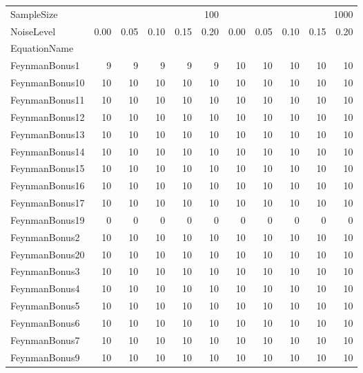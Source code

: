 \begin{tabular}{lrrrrrrrrrr}
\toprule
SampleSize & \multicolumn{5}{r}{100} & \multicolumn{5}{r}{1000} \\
NoiseLevel & 0.00 & 0.05 & 0.10 & 0.15 & 0.20 & 0.00 & 0.05 & 0.10 & 0.15 & 0.20 \\
EquationName &  &  &  &  &  &  &  &  &  &  \\
\midrule
FeynmanBonus1 & 9 & 9 & 9 & 9 & 9 & 10 & 10 & 10 & 10 & 10 \\
FeynmanBonus10 & 10 & 10 & 10 & 10 & 10 & 10 & 10 & 10 & 10 & 10 \\
FeynmanBonus11 & 10 & 10 & 10 & 10 & 10 & 10 & 10 & 10 & 10 & 10 \\
FeynmanBonus12 & 10 & 10 & 10 & 10 & 10 & 10 & 10 & 10 & 10 & 10 \\
FeynmanBonus13 & 10 & 10 & 10 & 10 & 10 & 10 & 10 & 10 & 10 & 10 \\
FeynmanBonus14 & 10 & 10 & 10 & 10 & 10 & 10 & 10 & 10 & 10 & 10 \\
FeynmanBonus15 & 10 & 10 & 10 & 10 & 10 & 10 & 10 & 10 & 10 & 10 \\
FeynmanBonus16 & 10 & 10 & 10 & 10 & 10 & 10 & 10 & 10 & 10 & 10 \\
FeynmanBonus17 & 10 & 10 & 10 & 10 & 10 & 10 & 10 & 10 & 10 & 10 \\
FeynmanBonus19 & 0 & 0 & 0 & 0 & 0 & 0 & 0 & 0 & 0 & 0 \\
FeynmanBonus2 & 10 & 10 & 10 & 10 & 10 & 10 & 10 & 10 & 10 & 10 \\
FeynmanBonus20 & 10 & 10 & 10 & 10 & 10 & 10 & 10 & 10 & 10 & 10 \\
FeynmanBonus3 & 10 & 10 & 10 & 10 & 10 & 10 & 10 & 10 & 10 & 10 \\
FeynmanBonus4 & 10 & 10 & 10 & 10 & 10 & 10 & 10 & 10 & 10 & 10 \\
FeynmanBonus5 & 10 & 10 & 10 & 10 & 10 & 10 & 10 & 10 & 10 & 10 \\
FeynmanBonus6 & 10 & 10 & 10 & 10 & 10 & 10 & 10 & 10 & 10 & 10 \\
FeynmanBonus7 & 10 & 10 & 10 & 10 & 10 & 10 & 10 & 10 & 10 & 10 \\
FeynmanBonus9 & 10 & 10 & 10 & 10 & 10 & 10 & 10 & 10 & 10 & 10 \\
\bottomrule
\end{tabular}
